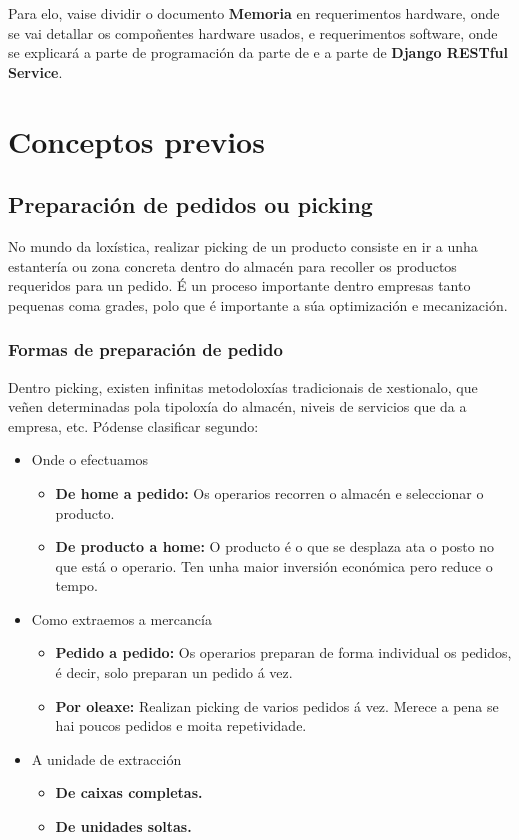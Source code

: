 \documentclass[11pt,twoside]{book}
\begin{document}
Para elo, vaise dividir o documento \textbf{Memoria} en requerimentos hardware, onde se vai detallar os compoñentes hardware usados, e requerimentos software, onde se explicará a parte de programación da parte de  e a parte de \textbf{Django RESTful Service}.

\chapter{Conceptos previos}

\section{Preparación de pedidos ou picking}

No mundo da loxística, realizar picking de un producto consiste en ir a unha estantería ou zona concreta dentro do almacén para recoller os productos requeridos para un pedido. É un proceso importante dentro empresas tanto pequenas coma grades, polo que é importante a súa optimización e mecanización.

\subsection{Formas de preparación de pedido}
Dentro picking, existen infinitas metodoloxías tradicionais de xestionalo, que veñen determinadas pola tipoloxía do almacén, niveis de servicios que da a empresa, etc. 
Pódense clasificar segundo:

\begin{itemize}
    \item Onde o efectuamos
        \begin{itemize}
            \item \textbf{De home a pedido:} Os operarios recorren o almacén e seleccionar o producto. 
            \item \textbf{De producto a home:} O producto é o que se desplaza ata o posto no que está o operario. Ten unha maior inversión económica pero reduce o tempo.
        \end{itemize}
    \item Como extraemos a mercancía
        \begin{itemize}
            \item \textbf{Pedido a pedido: } Os operarios preparan de forma individual os pedidos, é decir, solo preparan un pedido á vez. 
            \item \textbf{Por oleaxe: } Realizan picking de varios pedidos á vez. Merece a pena se hai poucos pedidos e moita repetividade. 
        \end{itemize}
    \item A unidade de extracción
        \begin{itemize}
            \item \textbf{De caixas completas.}
            \item \textbf{De unidades soltas.}
        \end{itemize}
\end{itemize}
\end{document}
